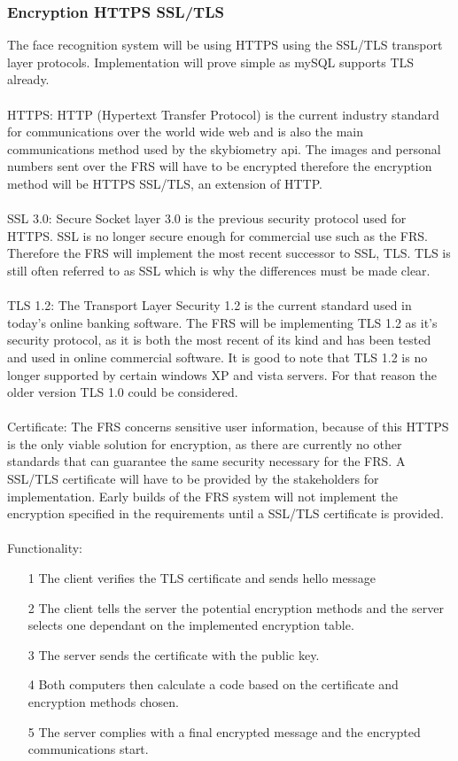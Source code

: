 \documentclass[a4paper,11pt]{article}
\begin{document}
\subsubsection{Encryption HTTPS SSL/TLS}
The face recognition system will be using HTTPS using the SSL/TLS transport layer protocols. Implementation will prove simple as mySQL supports TLS already. 
\\\\
HTTPS: HTTP (Hypertext Transfer Protocol) is the current industry standard for communications over the world wide web and is also the main communications method used by the skybiometry api. The images and personal numbers sent over the FRS will have to be encrypted therefore the encryption method will be HTTPS SSL/TLS, an extension of HTTP.
\\\\
SSL 3.0: Secure Socket layer 3.0 is the previous security protocol used for HTTPS. SSL is no longer secure enough for commercial use such as the FRS. Therefore the FRS will implement the most recent successor to SSL, TLS. TLS is still often referred to as SSL which is why the differences must be made clear.
\\\\
TLS 1.2: The Transport Layer Security 1.2 is the current standard used in today's online banking software. The FRS will be implementing TLS 1.2 as it’s security protocol, as it is both the most recent of its kind and has been tested and used in online commercial software. It is good to note that TLS 1.2 is no longer supported by certain windows XP and vista servers. For that reason the older version TLS 1.0 could be considered.
\\\\
Certificate: The FRS concerns sensitive user information, because of this HTTPS is the only viable solution for encryption, as there are currently no other standards that can guarantee the same security necessary for the FRS. A SSL/TLS certificate will have to be provided by the stakeholders for implementation. Early builds of the FRS system will not implement the encryption specified in the requirements until a SSL/TLS certificate is provided. 
\\\\
Functionality:
\begin{itemize}
\item[1] The client verifies the TLS certificate and sends hello message
\item[2] The client tells the server the potential encryption methods and the server selects one dependant on the implemented encryption table.
\item[3] The server sends the certificate with the public key.
\item[4] Both computers then calculate a code based on the certificate and encryption methods chosen.
\item[5] The server complies with a final encrypted message and the encrypted communications start.
\end{itemize}
\end{document}
